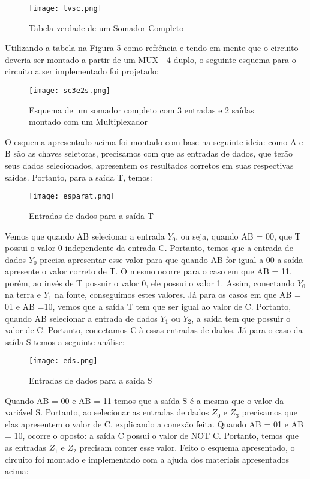 \documentclass[12pt]{article}
\begin{document}
\begin{figure}[H]
\centering
\texttt{[image: tvsc.png]}
\caption{Tabela verdade de um Somador Completo}
\label{fig:tvsc}
\end{figure}

Utilizando a tabela na Figura 5 como refrência e tendo em mente que o circuito deveria ser montado a partir de um MUX - 4 duplo, o seguinte esquema para o circuito a ser implementado foi projetado:

\begin{figure}[H]
	\centering
	\texttt{[image: sc3e2s.png]}
	\caption{Esquema de um somador completo com 3 entradas e 2 saídas montado com um Multiplexador}
	\label{fig:3e2s}
\end{figure}

O esquema apresentado acima foi montado com base na seguinte ideia: como A e B são as chaves seletoras, precisamos com que as entradas de dados, que terão seus dados selecionados, apresentem os resultados corretos em suas respectivas saídas. Portanto, para a saída T, temos:

\begin{figure}[H]
	\centering
	\texttt{[image: esparat.png]}
	\caption{Entradas de dados para a saída T}
	\label{fig:est}
\end{figure}

Vemos que quando AB selecionar a entrada $Y_{0}$, ou seja, quando AB = 00, que T possui o valor 0 independente da entrada C. Portanto, temos que a entrada de dados $Y_{0}$ precisa apresentar esse valor para que quando AB for igual a 00 a saída apresente o valor correto de T. O mesmo ocorre para o caso em que AB = 11, porém, ao invés de T possuir o valor 0, ele possui o valor 1. Assim, conectando $Y_{0}$ na terra e $Y_{1}$ na fonte, conseguimos estes valores. Já para os casos em que AB = 01 e AB =10, vemos que a saída T tem que ser igual ao valor de C. Portanto, quando AB selecionar a entrada de dados $Y_{1}$ ou $Y_{2}$, a saída tem que possuir o valor de C. Portanto, conectamos C à essas entradas de dados.
Já para o caso da saída S temos a seguinte análise:

\begin{figure}[H]
	\centering
	\texttt{[image: eds.png]}
	\caption{Entradas de dados para a saída S}
	\label{fig:eds}
\end{figure}

Quando AB = 00 e AB = 11 temos que a saída S é a mesma que o valor da variável S. Portanto, ao selecionar as entradas de dados $Z_{0}$ e $Z_{3}$ precisamos que elas apresentem o valor de C, explicando a conexão feita. Quando AB = 01 e AB = 10, ocorre o oposto: a saída C possui o valor de NOT C. Portanto, temos que as entradas $Z_{1}$ e $Z_{2}$ precisam conter esse valor. 
Feito o esquema apresentado, o circuito foi montado e implementado com a ajuda dos materiais apresentados acima:
\end{document}
